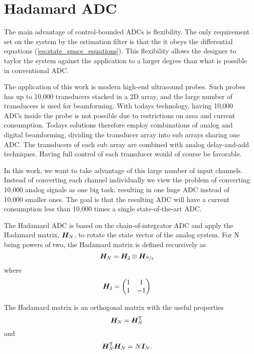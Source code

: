 
\chapter{Hadamard ADC}
\label{sec:HadamardADC}

The main advantage of control-bounded ADCs is flexibility. The only requirement set on the system by the estimation filter is that the it obeys the differential equations (\ref{eq:state_space_equations}). This flexibility allows the designer to taylor the system against the application to a larger degree than what is possible in conventional ADC.

The application of this work is modern high-end ultrasound probes. Such probes has up to 10,000 transducers stacked in a 2D array, and the large number of transducers is used for beamforming. With todays technology, having 10,000 ADCs inside the probe is not possible due to restrictions on area and current consumption. Todays solutions therefore employ combinations of analog and digital beamforming, dividing the transducer array into sub arrays sharing one ADC. The transducers of each sub array are combined with analog delay-and-add techniques. Having full control of each transducer would of course be favorable.

In this work, we want to take advantage of this large number of input channels. Instead of converting each channel individually we view the problem of converting 10,000 analog signals as one big task, resulting in one huge ADC instead of 10,000 smaller ones. The goal is that the resulting ADC will have a current consumption less than 10,000 times a single state-of-the-art ADC.

The Hadamard ADC is based on the chain-of-integrator ADC and apply the Hadamard matrix, $\bm{H_}{N}$, to rotate the state vector of the analog system. For N being powers of two, the Hadamard matrix is defined recursively as
\begin{equation}
    \label{eq:defn}
    \bm{H_}{N} = \bm{H_}{2} \otimes \bm{H_}{\nicefrac{N}{2}}
\end{equation}
where
\begin{equation}
    \label{eq:def2}
    \bm{H_}{2} =
    \begin{pmatrix}
    1 & 1 \\
    1 & -1
    \end{pmatrix}
\end{equation}

The Hadamard matrix is an orthogonal matrix with the useful properties
\begin{equation}
    \label{eq:Hmat_symmetry}
    \bm{H_}{N} = \bm{H_}{N}^\mathsf{T}
\end{equation}
and
\begin{equation}
    \label{eq:Hmat_inverse}
    \bm{H_}{N}^\mathsf{T}\bm{H_}{N} = N\bm{I}_{N}.
\end{equation}

